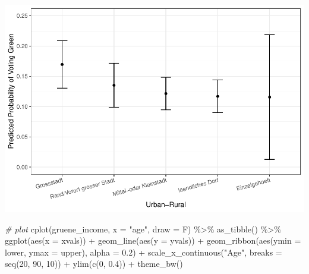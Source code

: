 \documentclass[
]{article}
\newenvironment{Shaded}{\begin{snugshade}}{\end{snugshade}}
\newcommand{\AttributeTok}[1]{\textcolor[rgb]{0.77,0.63,0.00}{#1}}
\newcommand{\CommentTok}[1]{\textcolor[rgb]{0.56,0.35,0.01}{\textit{#1}}}
\newcommand{\DecValTok}[1]{\textcolor[rgb]{0.00,0.00,0.81}{#1}}
\newcommand{\FloatTok}[1]{\textcolor[rgb]{0.00,0.00,0.81}{#1}}
\newcommand{\FunctionTok}[1]{\textcolor[rgb]{0.00,0.00,0.00}{#1}}
\newcommand{\NormalTok}[1]{#1}
\newcommand{\SpecialCharTok}[1]{\textcolor[rgb]{0.00,0.00,0.00}{#1}}
\newcommand{\StringTok}[1]{\textcolor[rgb]{0.31,0.60,0.02}{#1}}
\begin{document}
\includegraphics{AVCD_Final_Assignment-Edenhofer_files/figure-latex/gruene-geography-1.pdf}

\begin{Shaded}
\begin{Highlighting}[]
\CommentTok{\# plot }
\FunctionTok{cplot}\NormalTok{(gruene\_income,}
       \AttributeTok{x =} \StringTok{"age"}\NormalTok{, }\AttributeTok{draw =}\NormalTok{ F) }\SpecialCharTok{\%\textgreater{}\%}
   \FunctionTok{as\_tibble}\NormalTok{() }\SpecialCharTok{\%\textgreater{}\%}
   \FunctionTok{ggplot}\NormalTok{(}\FunctionTok{aes}\NormalTok{(}\AttributeTok{x =}\NormalTok{ xvals)) }\SpecialCharTok{+}
   \FunctionTok{geom\_line}\NormalTok{(}\FunctionTok{aes}\NormalTok{(}\AttributeTok{y =}\NormalTok{ yvals)) }\SpecialCharTok{+}
   \FunctionTok{geom\_ribbon}\NormalTok{(}\FunctionTok{aes}\NormalTok{(}\AttributeTok{ymin =}\NormalTok{ lower, }\AttributeTok{ymax =}\NormalTok{ upper), }\AttributeTok{alpha =} \FloatTok{0.2}\NormalTok{) }\SpecialCharTok{+}
   \FunctionTok{scale\_x\_continuous}\NormalTok{(}\StringTok{"Age"}\NormalTok{, }\AttributeTok{breaks =} \FunctionTok{seq}\NormalTok{(}\DecValTok{20}\NormalTok{, }\DecValTok{90}\NormalTok{, }\DecValTok{10}\NormalTok{)) }\SpecialCharTok{+}
   \FunctionTok{ylim}\NormalTok{(}\FunctionTok{c}\NormalTok{(}\DecValTok{0}\NormalTok{, }\FloatTok{0.4}\NormalTok{)) }\SpecialCharTok{+}
   \FunctionTok{theme\_bw}\NormalTok{()  }
\end{Highlighting}
\end{Shaded}
\end{document}
